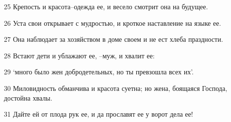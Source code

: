 \par 25 Крепость и красота--одежда ее, и весело смотрит она на будущее.
\par 26 Уста свои открывает с мудростью, и кроткое наставление на языке ее.
\par 27 Она наблюдает за хозяйством в доме своем и не ест хлеба праздности.
\par 28 Встают дети и ублажают ее, --муж, и хвалит ее:
\par 29 `много было жен добродетельных, но ты превзошла всех их'.
\par 30 Миловидность обманчива и красота суетна; но жена, боящаяся Господа, достойна хвалы.
\par 31 Дайте ей от плода рук ее, и да прославят ее у ворот дела ее!



